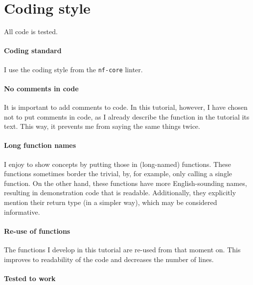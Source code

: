 \section{Coding style}

All code is tested.

\paragraph{Coding standard}

I use the coding style from the  \verb|nf-core| linter.

\paragraph{No comments in code}

It is important to add comments to code.
In this tutorial, however, I have chosen not to put comments in code, 
as I already describe the function in the tutorial its text.
This way, it prevents me from saying the same things twice.

\paragraph{Long function names}

I enjoy to show concepts by putting those in (long-named) functions.
These functions sometimes border the trivial, by, for example, only calling
a single function.
On the other hand, these functions have more English-sounding names, resulting
in demonstration code that is readable.
Additionally, they explicitly mention their return type (in a simpler way),
which may be considered informative.

\paragraph{Re-use of functions}

The functions I develop in this tutorial are re-used from that moment on.
This improves to readability of the code and decreases the number of lines.

\paragraph{Tested to work}

